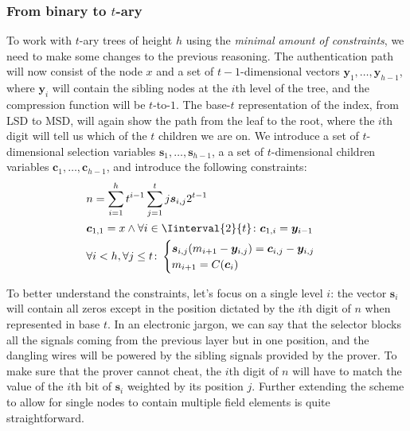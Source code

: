 \subsubsection*{From binary to \(t\)-ary}
To work with \(t\)-ary trees of height \(h\) using the \emph{minimal amount of constraints}, we 
need to make some changes to the previous reasoning.
The authentication path will now consist of the node \(x\) and a set of \(t-1\)-dimensional 
vectors \(\bm{y}_1, \dots, \bm{y}_{h-1}\), where \(\bm{y}_i\) will contain the sibling nodes at 
the \(i\)th level of the tree, and the compression function will be \(t\)-to-\(1\).
The base-\(t\) representation of the index, from LSD to MSD, will again show the path from the leaf 
to the root, where the \(i\)th digit will tell us which of the \(t\) children we are on.
We introduce a set of \(t\)-dimensional selection variables \(\bm{s}_1, \dots, \bm{s}_{h-1}\), a
a set of \(t\)-dimensional children variables \(\bm{c}_1, \dots, \bm{c}_{h-1}\), and introduce 
the following constraints:
\begin{align*}
  & n = \sum_{i=1}^{h}{t^{i-1}\sum_{j=1}^{t}{j\bm{s}_{i,j}2^{t-1}}} \\
  & \bm{c}_{1,1} = x \land \forall i \in \Iinterval{2}{t}\colon \bm{c}_{1,i} = \bm{y}_{i-1} \\
  & \forall i < h, \forall j \le t\colon 
  \begin{cases}
    \bm{s}_{i,j}\Parens*{m_{i+1} - \bm{y}_{i,j}} = \bm{c}_{i,j} - \bm{y}_{i,j} \\
    m_{i+1} = \call{C}{\bm{c}_i}
  \end{cases}
\end{align*}

To better understand the constraints, let's focus on a single level \(i\): the vector 
\(\bm{s}_i\) will contain all zeros except in the position dictated by the \(i\)th digit of 
\(n\) when represented in base \(t\). 
In an electronic jargon, we can say that the selector blocks all the signals coming from the 
previous layer but in one position, and the dangling wires will be powered by the sibling signals 
provided by the prover.
To make sure that the prover cannot cheat, the \(i\)th digit of \(n\) will have to match the 
value of the \(i\)th bit of \(\bm{s}_i\) weighted by its position \(j\).
Further extending the scheme to allow for single nodes to contain multiple field elements is 
quite straightforward.

